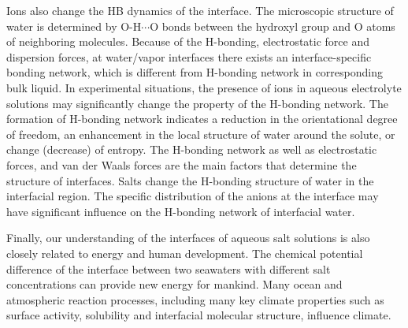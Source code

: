 Ions also change the HB dynamics of the interface.
The microscopic structure of water is determined by O-H$\cdots$O bonds between the hydroxyl group 
and O atoms of neighboring molecules. 
Because of the H-bonding, electrostatic force and dispersion forces, 
at water/vapor interfaces there exists an interface-specific bonding network, 
which is different from H-bonding network in corresponding bulk liquid\cite{Allongue96,Velasco-Velez14}.
In experimental situations, the presence of ions in aqueous 
electrolyte solutions may significantly change the property of the H-bonding network. 
The formation of H-bonding network indicates a reduction in the orientational degree of freedom, 
an enhancement in the local structure of water around the solute, or change (decrease) of entropy\cite{Frank45a, Frank45b,Frank45c}.
%
The H-bonding network\cite{Eisenberg1969,Speedy1976,Poole1994,Soper2008b,Ball2001,Nilsson2011,Pettersson2015} as well as electrostatic forces, 
and van der Waals forces are the main factors that determine the structure of interfaces. 
Salts change the H-bonding structure of water in the interfacial region\cite{Raymond2004,McLain2006,Ball2008}. 
The specific distribution of the anions at the interface may have significant influence on the H-bonding network of interfacial water\cite{Morita2008}.


Finally, our understanding of the interfaces of aqueous salt solutions is also closely related to energy and human development. 
The chemical potential difference of the interface between two seawaters with different salt concentrations can provide new energy for mankind\cite{Pattle1954,Loeb1976}. 
Many ocean and atmospheric reaction processes, including many key climate properties such as surface activity, 
solubility and interfacial molecular structure, influence climate\cite{Schill2015,Cochran2017}. 

